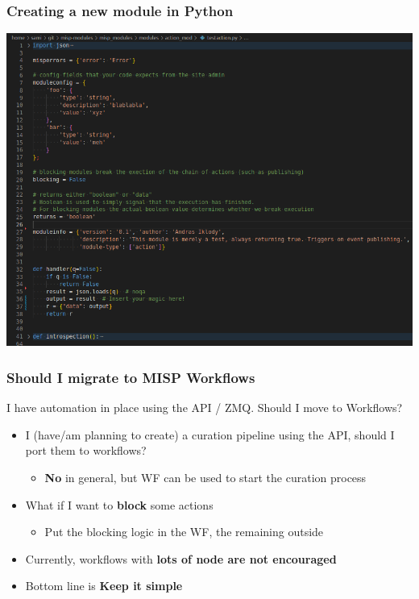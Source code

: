 \begin{frame}
    \frametitle{Creating a new module in Python}
    \begin{center}
        \includegraphics[width=1.0\linewidth]{pictures/custom-2.png}
    \end{center}
\end{frame}

\begin{frame}
    \frametitle{Should I migrate to MISP Workflows}
    I have automation in place using the API / ZMQ. Should I move to Workflows?
    \vspace{1em}
    \begin{itemize}
        \item I (have/am planning to create) a curation pipeline using the API, should I port them to workflows?
        \begin{itemize}
            \item \textbf{No} in general, but WF can be used to start the curation process
        \end{itemize}
        \item What if I want to \textbf{block} some actions
        \begin{itemize}
            \item Put the blocking logic in the WF, the remaining outside
        \end{itemize}
        \item Currently, workflows with \textbf{ lots of node are not encouraged}
        \item Bottom line is \textbf{Keep it simple}
    \end{itemize}
\end{frame}

